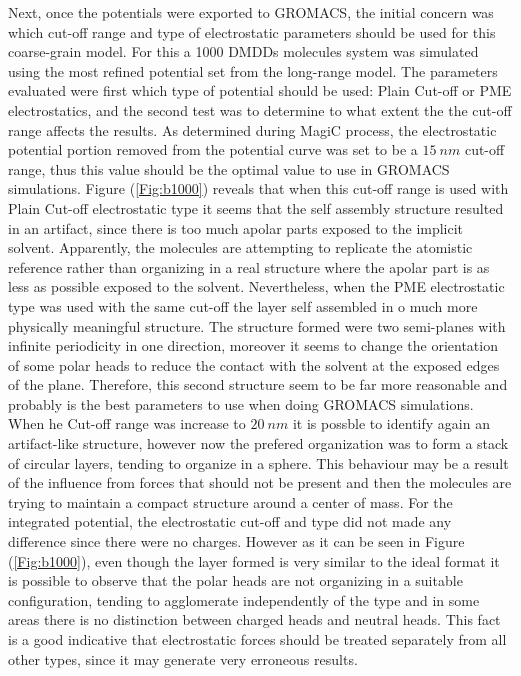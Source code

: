 \documentclass[10pt,a4paper,twoside]{article}
\begin{document}
 \label{sec:rescutoff}
Next, once the potentials were exported to GROMACS, the initial concern was which cut-off range and type of electrostatic parameters should be used for this coarse-grain model. For this a 1000 DMDDs molecules system was simulated using the most refined potential set from the long-range model. The parameters evaluated were first which type of potential should be used: Plain Cut-off or PME electrostatics, and the second test was to determine to what extent the the cut-off range affects the results. As determined during MagiC process, the electrostatic potential portion removed from the potential curve was set to be a $15 \ nm$ cut-off range, thus this value should be the optimal value to use in GROMACS simulations. Figure (\ref{Fig:b1000}) reveals that when this cut-off range is used with Plain Cut-off electrostatic type it seems that the self assembly structure resulted in an artifact, since there is too much apolar parts exposed to the implicit solvent. Apparently, the molecules are attempting to replicate the atomistic reference rather than organizing in a real structure where the apolar part is as less as possible exposed to the solvent. Nevertheless, when the PME electrostatic type was used with the same cut-off the layer self assembled in o much more physically meaningful structure. The structure formed were two semi-planes with infinite periodicity in one direction, moreover it seems to change the orientation of some polar heads to reduce the contact with the solvent at the exposed edges of the plane. Therefore, this second structure seem to be far more reasonable and probably is the best parameters to use when doing GROMACS simulations. When he Cut-off range was increase to $20 \ nm$ it is possble to identify again an artifact-like structure, however now the prefered organization was to form a stack of circular layers, tending to organize in a sphere. This behaviour may be a result of the influence from forces that should not be present and then the molecules are trying to maintain a compact structure around a center of mass. For the integrated potential, the electrostatic cut-off and type did not made any difference since there were no charges. However as it can be seen in Figure (\ref{Fig:b1000}), even though the layer formed is very similar to the ideal format it is possible to observe that the polar heads are not organizing in a suitable configuration, tending to agglomerate independently of the type and in some areas there is no distinction between charged heads and neutral heads. This fact is a good indicative that electrostatic forces should be treated separately from all other types, since it may generate very erroneous results.
\end{document}
